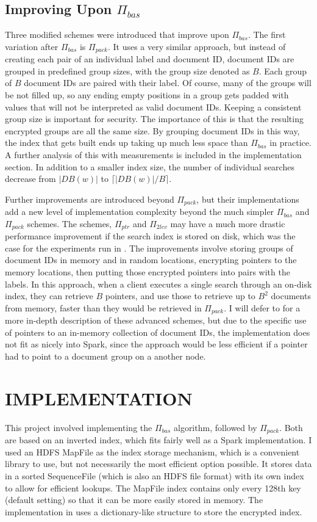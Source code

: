 \documentclass{sig-alternate-05-2015}
\begin{document}
\subsection{Improving Upon $\Pi_{bas}$}
Three modified schemes were introduced that improve upon $\Pi_{bas}$. The first variation after $\Pi_{bas}$ is $\Pi_{pack}$. It uses a very similar approach, but instead of creating each pair of an individual label and document ID, document IDs are grouped in predefined group sizes, with the group size denoted as $B$. Each group of $B$ document IDs are paired with their label. Of course, many of the groups will be not filled up, so any ending empty positions in a group gets padded with values that will not be interpreted as valid document IDs. Keeping a consistent group size is important for security. The importance of this is that the resulting encrypted groups are all the same size. By grouping document IDs in this way, the index that gets built ends up taking up much less space than $\Pi_{bas}$ in practice. A further analysis of this with measurements is included in the implementation section. In addition to a smaller index size, the number of individual searches decrease from $|DB(w)|$ to $\lceil|DB(w)|/B\rceil$.

Further improvements are introduced beyond $\Pi_{pack}$, but their implementations add a new level of implementation complexity beyond the much simpler $\Pi_{bas}$ and $\Pi_{pack}$ schemes. The schemes, $\Pi_{ptr}$ and $\Pi_{2lev}$ may have a much more drastic performance improvement if the search index is stored on disk, which was the case for the experiments run in \cite{davidcashetal.2014}. The improvements involve storing groups of document IDs in memory and in random locations, encrypting pointers to the memory locations, then putting those encrypted pointers into pairs with the labels. In this approach, when a client executes a single search through an on-disk index, they can retrieve $B$ pointers, and use those to retrieve up to $B^2$ documents from memory, faster than they would be retrieved in $\Pi_{pack}$. I will defer to \cite{davidcashetal.2014} for a more in-depth description of these advanced schemes, but due to the specific use of pointers to an in-memory collection of document IDs, the implementation does not fit as nicely into Spark, since the approach would be less efficient if a pointer had to point to a document group on a another node.

\section{IMPLEMENTATION}
This project involved implementing the $\Pi_{bas}$ algorithm, followed by $\Pi_{pack}$. Both are based on an inverted index, which fits fairly well as a Spark implementation. I used an HDFS MapFile as the index storage mechanism, which is a convenient library to use, but not necessarily the most efficient option possible. It stores data in a sorted SequenceFile (which is also an HDFS file format) with its own index to allow for efficient lookups. The MapFile index contains only every 128th key (default setting) so that it can be more easily stored in memory. The implementation in \cite{davidcashetal.2014} uses a dictionary-like structure to store the encrypted index.
\end{document}
